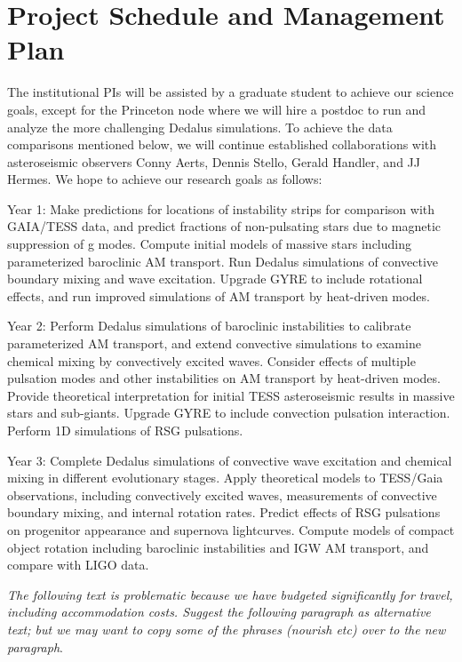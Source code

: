\section{Project Schedule and Management Plan}

The institutional PIs will be assisted by a graduate student to achieve our science goals, except for the Princeton node where we will hire a postdoc to run and analyze the more challenging Dedalus simulations. To achieve the data comparisons mentioned below, we will continue established collaborations with asteroseismic observers Conny Aerts, Dennis Stello, Gerald Handler, and JJ Hermes. We hope to achieve our research goals as follows:

Year 1: Make predictions for locations of instability strips for comparison with GAIA/TESS data, and predict fractions of non-pulsating stars due to magnetic suppression of g modes. Compute initial models of massive stars including parameterized baroclinic AM transport. Run Dedalus simulations of convective boundary mixing and wave excitation. Upgrade GYRE to include rotational effects, and run improved simulations of AM transport by heat-driven modes. 

Year 2: Perform Dedalus simulations of baroclinic instabilities to calibrate parameterized AM transport, and extend convective simulations to examine chemical mixing by convectively excited waves. Consider effects of multiple pulsation modes and other instabilities on AM transport by heat-driven modes. Provide theoretical interpretation for initial TESS asteroseismic results in massive stars and sub-giants. Upgrade GYRE to include convection pulsation interaction. Perform 1D simulations of RSG pulsations.

Year 3: Complete Dedalus simulations of convective wave excitation and chemical mixing in different evolutionary stages. Apply theoretical models to TESS/Gaia observations, including convectively excited waves, measurements of convective boundary mixing, and internal rotation rates. Predict effects of RSG pulsations on progenitor appearance and supernova lightcurves. Compute models of compact object rotation including baroclinic instabilities and IGW AM transport, and compare with LIGO data.

\emph{The following text is problematic because we have budgeted significantly for travel, including accommodation costs. Suggest the following paragraph as alternative text; but we may want to copy some of the phrases (nourish etc) over to the new paragraph}.

